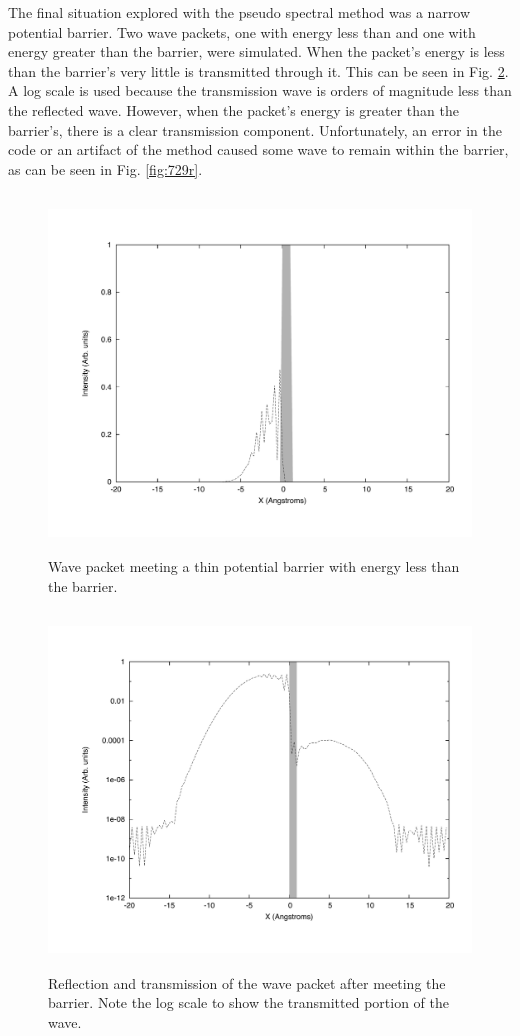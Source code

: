 \documentclass[12pt]{article}
\begin{document}
The final situation explored with the pseudo spectral method was a narrow potential barrier.  Two wave packets, one with energy less than and one with energy greater than the barrier, were simulated.  When the packet's energy is less than the barrier's very little is transmitted through it.  This can be seen in Fig. \ref{fig:728r}.  A log scale is used because the transmission wave is orders of magnitude less than the reflected wave.  However, when the packet's energy is greater than the barrier's, there is a clear transmission component.  Unfortunately, an error in the code or an artifact of the method caused some wave to remain within the barrier, as can be seen in Fig. \ref{fig:729r}.


\begin{figure}[!h]
\centering
\includegraphics[width =120 mm, height = 95mm]{Ex_7_28_collis.pdf}
\caption{Wave packet meeting a thin potential barrier with energy less than the barrier.}
\label{fig:728c}
\end{figure}
\begin{figure}[!h]
\centering
\includegraphics[width =120 mm, height = 95mm]{Ex_7_28_reflec.pdf}
\caption{Reflection and transmission of the wave packet after meeting the barrier.  Note the log scale to show the transmitted portion of the wave.}
\label{fig:728r}
\end{figure}
\end{document}
